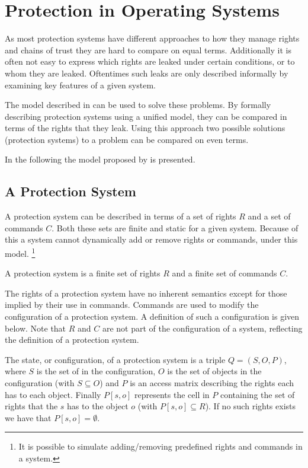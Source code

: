 \section{Protection in Operating Systems}
As most protection systems have different approaches to how they manage rights and chains of trust they are hard to compare on equal terms.
Additionally it is often not easy to express which rights are leaked under certain conditions, or to whom they are leaked.
Oftentimes such leaks are only described informally by examining key features of a given system.

The model described in \citet{HRU} can be used to solve these problems.
By formally describing protection systems using a unified model, they can be compared in terms of the rights that they leak.
Using this approach two possible solutions (protection systems) to a problem can be compared on even terms.

In the following the model proposed by \citet{HRU} is presented.

\subsection{A Protection System}
A protection system can be described in terms of a set of rights $R$ and a set of commands $C$.
Both these sets are finite and static for a given system.
Because of this a system cannot dynamically add or remove rights or commands, under this model.
\footnote{It is possible to simulate adding/removing predefined rights and commands in a system.}

\begin{definition}
  A protection system is a finite set of rights $R$ and a finite set of commands $C$.
\end{definition}

The rights of a protection system have no inherent semantics except for those implied by their use in commands.
Commands are used to modify the configuration of a protection system.
A definition of such a configuration is given below.
Note that $R$ and $C$ are not part of the configuration of a system, reflecting the definition of a protection system.

\begin{definition}\label{protection:def:state}
The state, or configuration, of a protection system is a triple $Q = (S, O, P)$, where $S$ is the set of \subjects{} in the configuration, $O$ is the set of objects in the configuration (with $S \subseteq O$) and $P$ is an access matrix describing the rights each \ssubject{} has to each object.
Finally $P[s, o]$ represents the cell in $P$ containing the set of rights that the \ssubject{} $s$ has to the object $o$ (with $P[s, o] \subseteq R$).
If no such rights exists we have that $P[s,o] = \emptyset$.
\end{definition}

